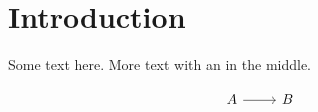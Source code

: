 \section{Introduction}
Some text here.
More text with an  in the middle.
\[
  \begin{tikzcd} A \arrow[r] & B \end{tikzcd}
\]

